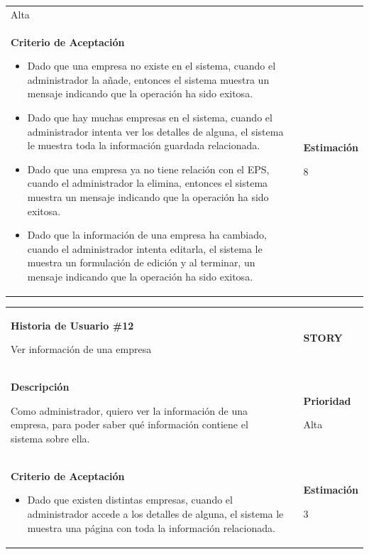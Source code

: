 \documentclass[12pt,a4paper]{article}
\begin{document}
\begin{center}
\begin{tabular}{|>{\columncolor[RGB]{215, 215, 215}} p{10cm} >{\columncolor[RGB]{215, 215, 215}} c >{\columncolor[RGB]{215, 215, 215}} p{2.5cm}|}
Alta\\

\textbf{Criterio de Aceptación}

\begin{itemize}
\item Dado que una empresa no existe en el sistema, cuando el
administrador la añade, entonces el sistema muestra un mensaje
indicando que la operación ha sido exitosa.
\item Dado que hay muchas empresas en el sistema, cuando el
administrador intenta ver los detalles de alguna, el sistema le
muestra toda la información guardada relacionada.
\item Dado que una empresa ya no tiene relación con el EPS, cuando el
administrador la elimina, entonces el sistema muestra un
mensaje indicando que la operación ha sido exitosa.
\item Dado que la información de una empresa ha cambiado, cuando
el administrador intenta editarla, el sistema le muestra un
formulación de edición y al terminar, un mensaje indicando que
la operación ha sido exitosa.
\end{itemize} & & \textbf{Estimación}

8 \\ 
\hline 
\end{tabular}
\vspace{5mm}

\begin{tabular}{| p{10cm} c p{2.5cm}|}
\hline 
\textbf{Historia de Usuario \#12}

Ver información de una empresa & & \textbf{{\Large STORY}} \\ 
\textbf{Descripción}

Como administrador, quiero ver la información de una empresa, para
poder saber qué información contiene el sistema sobre ella. &  & \textbf{Prioridad}

Alta\\

\textbf{Criterio de Aceptación}

\begin{itemize}
\item Dado que existen distintas empresas, cuando el administrador
accede a los detalles de alguna, el sistema le muestra una página
con toda la información relacionada.
\end{itemize} & & \textbf{Estimación}

3 \\ 
\hline 
\end{tabular}
\vspace{5mm}


\end{center}
\end{document}
